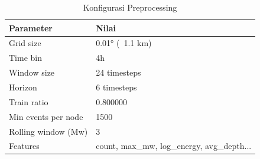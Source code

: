 \begin{table}
\caption{Konfigurasi Preprocessing}
\label{tab:preprocess_config}
\begin{tabular}{|l|l|}
\toprule
Parameter & Nilai \\
\midrule
Grid size & 0.01° (~1.1 km) \\
Time bin & 4h \\
Window size & 24 timesteps \\
Horizon & 6 timesteps \\
Train ratio & 0.800000 \\
Min events per node & 1500 \\
Rolling window (Mw) & 3 \\
Features & count, max_mw, log_energy, avg_depth... \\
\bottomrule
\end{tabular}
\end{table}
